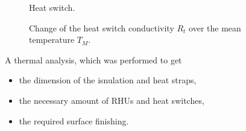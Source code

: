 \begin{figure}[h]
	\centering
	\qquad\qquad
	\caption{Heat switch.}
	\label{fig:tcs_switch01}
\end{figure}

\begin{figure}[h]
	\centering
	\qquad
	\caption{Change of the heat switch conductivity $R_t$ over the mean temperature $T_M$.}
	\label{fig:tcs_switch02}
\end{figure}


A thermal analysis, which was performed to get
\begin{itemize}
	\item the dimension of the isnulation and heat straps,
	\item the necessary amount of RHUs and heat switches,
	\item the required surface finishing.
\end{itemize}



